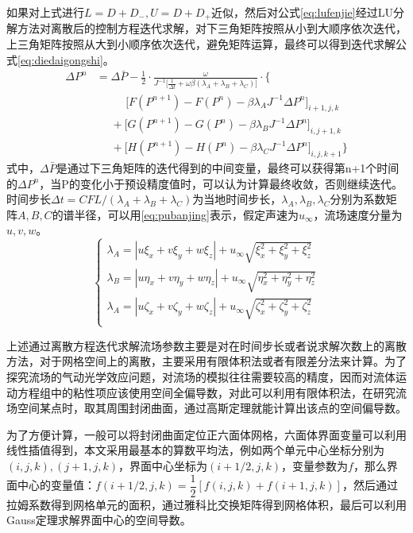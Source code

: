 如果对上式进行$L=D+D_-,U=D+D_+$近似，然后对公式\eqref{eq:lufenjie}经过LU分解方法对离散后的控制方程迭代求解，对下三角矩阵按照从小到大顺序依次迭代，上三角矩阵按照从大到小顺序依次迭代，避免矩阵运算，最终可以得到迭代求解公式\eqref{eq:diedaigongshi}。
\begin{equation}
\begin{aligned}
\Delta P^n&=\Delta \bar{P}-\frac{1}{2}\cdot\frac{\omega}{J^{-1}\big[\frac{1}{\Delta t}+\omega\beta(\lambda_A+\lambda_B+\lambda_C)\big]}\cdot\Big\{\\
&\phantom{==}\big[F(P^{n+1})-F(P^n)-\beta\lambda_AJ^{-1}\Delta P^n\big]_{i+1,j,k}\\
&\phantom{=}+\big[G(P^{n+1})-G(P^n)-\beta\lambda_BJ^{-1}\Delta P^n\big]_{i,j+1,k}\\
&\phantom{=}+\big[H(P^{n+1})-H(P^n)-\beta\lambda_CJ^{-1}\Delta P^n\big]_{i,j,k+1}\Big\}
\end{aligned}
\label{eq:diedaigongshi}
\end{equation}
式中，$\Delta \bar{P}$是通过下三角矩阵的迭代得到的中间变量，最终可以获得第n+1个时间的$\Delta P^n$，当P的变化小于预设精度值时，可以认为计算最终收敛，否则继续迭代。
时间步长$\Delta t=CFL/(\lambda_A+\lambda_B+\lambda_C)$为当地时间步长，$\lambda_A,\lambda_B,\lambda_C$分别为系数矩阵$A,B,C$的谱半径，可以用\eqref{eq:pubanjing}表示，假定声速为$u_\infty$，流场速度分量为$u,v,w$。
\begin{equation}
\left\{
\begin{aligned}
\lambda_A=|u\xi_x+v\xi_y+w\xi_z|+u_\infty\sqrt{\xi_x^2+\xi_y^2+\xi_z^2}\\
\lambda_B=|u\eta_x+v\eta_y+w\eta_z|+u_\infty\sqrt{\eta_x^2+\eta_y^2+\eta_z^2}\\
\lambda_A=|u\zeta_x+v\zeta_y+w\zeta_z|+u_\infty\sqrt{\zeta_x^2+\zeta_y^2+\zeta_z^2}\\
\end{aligned}
\right.
\label{eq:pubanjing}
\end{equation}

上述通过离散方程迭代求解流场参数主要是对在时间步长或者说求解次数上的离散方法，对于网格空间上的离散，主要采用有限体积法或者有限差分法来计算。为了探究流场的气动光学效应问题，对流场的模拟往往需要较高的精度，因而对流体运动方程组中的粘性项应该使用空间全偏导数，对此可以利用有限体积法，在研究流场空间某点时，取其周围封闭曲面，通过高斯定理就能计算出该点的空间偏导数。

为了方便计算，一般可以将封闭曲面定位正六面体网格，六面体界面变量可以利用线性插值得到，本文采用最基本的算数平均法，例如两个单元中心坐标分别为$(i,j,k),(j+1,j,k)$，界面中心坐标为$(i+1/2,j,k)$，变量参数为$f$，那么界面中心的变量值：$f(i+1/2,j,k)=\dfrac{1}{2}[f(i,j,k)+f(i+1,j,k)]$，然后通过拉姆系数得到网格单元的面积，通过雅科比交换矩阵得到网格体积，最后可以利用Gauss定理求解界面中心的空间导数。
